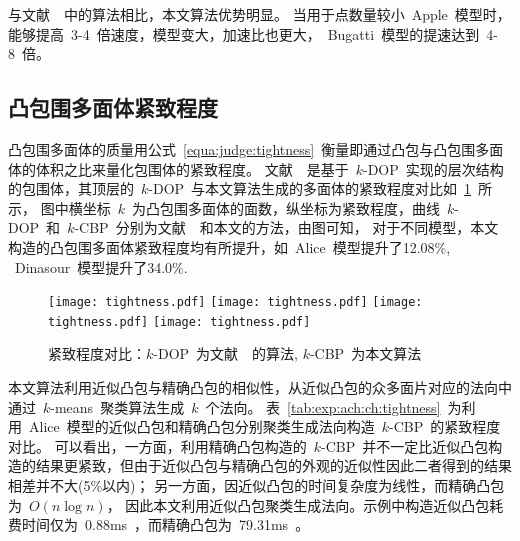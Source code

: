与文献~~中的算法相比，本文算法优势明显。
当用于点数量较小~Apple~模型时，能够提高~3-4~倍速度，模型变大，加速比也更大，~Bugatti~模型的提速达到~4-8~倍。

\subsection{凸包围多面体紧致程度}
\label{subsec:exper:tightness}

凸包围多面体的质量用公式~\ref{equa:judge:tightness}~衡量即通过凸包与凸包围多面体的体积之比来量化包围体的紧致程度。
文献~~是基于~$k$-DOP~实现的层次结构的包围体，其顶层的~$k$-DOP~与本文算法生成的多面体的紧致程度对比如~\ref{chart:exps:tightness}~所示，
图中横坐标~$k$~为凸包围多面体的面数，纵坐标为紧致程度，曲线~$k$-DOP~和~$k$-CBP~分别为文献~~和本文的方法，由图可知，
对于不同模型，本文构造的凸包围多面体紧致程度均有所提升，如~Alice~模型提升了12.08\%, ~Dinasour~模型提升了34.0\%.

\begin{figure}[htbp] 
\centering
{}
{
    \texttt{[image: tightness.pdf]}
}
{  
   \texttt{[image: tightness.pdf]}
}
\linebreak
{}
{  
    \texttt{[image: tightness.pdf]}
}
{  
   \texttt{[image: tightness.pdf]}
}
\caption{紧致程度对比：$k$-DOP~为文献~~的算法, $k$-CBP~为本文算法}
\label{chart:exps:tightness}
\end{figure}

本文算法利用近似凸包与精确凸包的相似性，从近似凸包的众多面片对应的法向中通过~$k$-means~聚类算法生成~$k$~个法向。
表~\ref{tab:exp:ach:ch:tightness}~为利用~Alice~模型的近似凸包和精确凸包分别聚类生成法向构造~$k$-CBP~的紧致程度对比。
可以看出，一方面，利用精确凸包构造的~$k$-CBP~并不一定比近似凸包构造的结果更紧致，但由于近似凸包与精确凸包的外观的近似性因此二者得到的结果相差并不大(5\%以内)；
另一方面，因近似凸包的时间复杂度为线性，而精确凸包为~$O(n\log n)$，
因此本文利用近似凸包聚类生成法向。示例中构造近似凸包耗费时间仅为~0.88ms~，而精确凸包为~79.31ms~。

